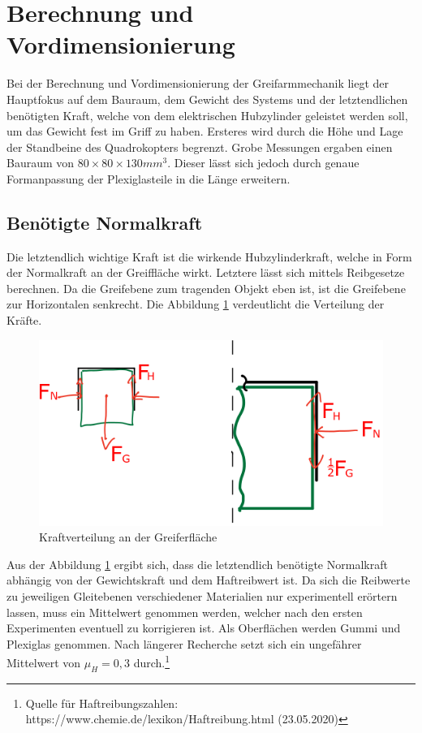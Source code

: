 \section{Berechnung und Vordimensionierung}
Bei der Berechnung und Vordimensionierung der Greifarmmechanik liegt der Hauptfokus auf dem Bauraum, dem Gewicht des Systems und der letztendlichen benötigten Kraft, welche von dem elektrischen Hubzylinder geleistet werden soll, um das Gewicht fest im Griff zu haben. Ersteres wird durch die Höhe und Lage der Standbeine des Quadrokopters begrenzt. Grobe Messungen ergaben einen Bauraum von  $80\times 80\times130 mm^3$. Dieser lässt sich jedoch durch genaue Formanpassung der Plexiglasteile in die Länge erweitern.

\subsection{Benötigte Normalkraft}
Die letztendlich wichtige Kraft ist die wirkende Hubzylinderkraft, welche in Form der Normalkraft an der Greiffläche wirkt. Letztere lässt sich mittels Reibgesetze berechnen. Da die Greifebene zum tragenden Objekt eben ist, ist die Greifebene zur Horizontalen senkrecht. Die Abbildung \ref{greiferfläche} verdeutlicht die Verteilung der Kräfte.
\begin{figure}[h]
	\begin{center}
	\includegraphics[scale=0.6]{"Grafiken/Greiferflaeche.png"}
	\caption{Kraftverteilung an der Greiferfläche}
	\label{greiferfläche}
	\end{center}
\end{figure}
Aus der Abbildung \ref{greiferfläche} ergibt sich, dass die letztendlich benötigte Normalkraft abhängig von der Gewichtskraft und dem Haftreibwert ist. Da sich die Reibwerte zu jeweiligen Gleitebenen verschiedener Materialien nur experimentell erörtern lassen, muss ein Mittelwert genommen werden, welcher nach den ersten Experimenten eventuell zu korrigieren ist. Als Oberflächen werden Gummi und Plexiglas genommen. Nach längerer Recherche setzt sich ein ungefährer Mittelwert von $\mu_H = 0,3$ durch.\footnote[1]{Quelle für Haftreibungszahlen: https://www.chemie.de/lexikon/Haftreibung.html (23.05.2020)}
